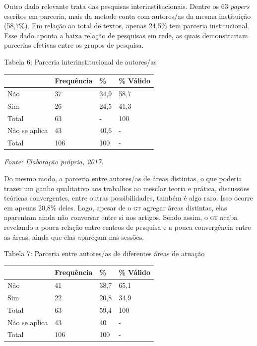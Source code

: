 Outro dado relevante trata das pesquisas interinstitucionais. Dentre os
63 \emph{papers} escritos em parceria, mais da metade conta com
autores/as da mesma instituição (58,7\%). Em relação ao total de textos,
apenas 24,5\% tem parceria institucional. Esse dado aponta a baixa
relação de pesquisas em rede, as quais demonstrariam parcerias efetivas
entre os grupos de pesquisa.

\begin{center}
Tabela 6: Parceria interinstitucional de autores/as
\end{center}

\begin{center}
\centering
\begin{tabular}{|l|l|l|l|}
\hline
 & \textbf{Frequência} & \textbf{\%} & \textbf{\% Válido} \\ \hline
Não & 37 & 34,9 & 58,7 \\ \hline
Sim & 26 & 24,5 & 41,3 \\ \hline
Total & 63 & - & 100 \\ \hline
Não se aplica & 43 & 40,6 & - \\ \hline
Total & 106 & 100 & - \\ \hline
\end{tabular}
\end{center}

\begin{center}
{\footnotesize\emph{Fonte: Elaboração própria, 2017.}}
\end{center}

Do mesmo modo, a parceria entre autores/as de áreas distintas, o que
poderia trazer um ganho qualitativo aos trabalhos ao mesclar teoria e
prática, discussões teóricas convergentes, entre outras possibilidades,
também é algo raro. Isso ocorre em apenas 20,8\% deles. Logo, apesar de
o \textsc{gt} agregar áreas distintas, elas aparentam ainda não conversar entre
si nos artigos. Sendo assim, o \textsc{gt} acaba revelando a pouca relação entre
centros de pesquisa e a pouca convergência entre as áreas, ainda que
elas apareçam nas sessões.

\begin{center}
Tabela 7: Parceria entre autores/as de diferentes áreas de atuação
\end{center}

\begin{center}
\begin{tabular}{|l|l|l|l|}
\hline
 & \textbf{Frequência} & \textbf{\%} & \textbf{\% Válido} \\ \hline
Não & 41 & 38,7 & 65,1 \\ \hline
Sim & 22 & 20,8 & 34,9 \\ \hline
Total & 63 & 59,4 & 100 \\ \hline
Não se aplica & 43 & 40 & - \\ \hline
Total & 106 & 100 & - \\ \hline
\end{tabular}
\end{center}

